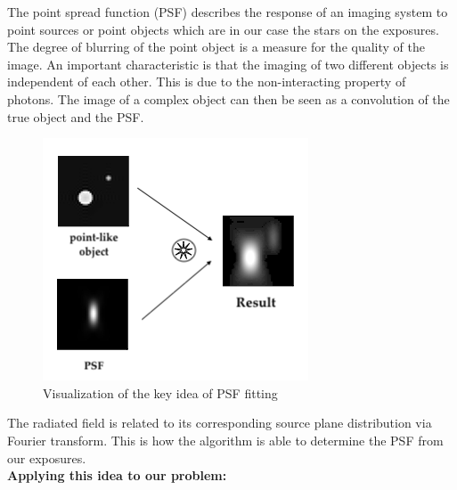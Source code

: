 The point spread function (PSF) describes the response of an imaging system to point sources or point objects which are in our case the stars on the exposures. The degree of blurring  of the point object is a measure for the quality of the image.
An important characteristic is that the imaging of two different objects is independent of each other. This is due to the non-interacting property of photons. The image of a complex object can then be seen as a convolution of the true object and the PSF.
\begin{figure}[H]
	\centering
	\includegraphics[scale=0.5]{figures/Introduction/psf}
	\caption{Visualization of the key idea of PSF fitting}
\end{figure}
The radiated field is related to its corresponding source plane distribution via Fourier transform. This is how the algorithm is able to determine the PSF from our exposures. \\

\textbf{Applying this idea to our problem:} 

